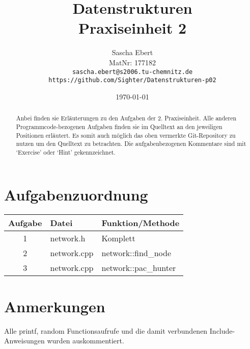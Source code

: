 \documentclass{article}
\title{Datenstrukturen\\Praxiseinheit 2}
\author
{
	Sascha Ebert\\
	MatNr: 177182\\
	\texttt{sascha.ebert@s2006.tu-chemnitz.de}\\
	\texttt{https://github.com/Sighter/Datenstrukturen-p02}\\
}
\date{\today}
\begin{document}
\maketitle

\begin{abstract}
Anbei finden sie Erläuterungen zu den Aufgaben der 2. Praxiseinheit.
Alle anderen Programmcode-bezogenen Aufgaben finden sie im Quelltext an den jeweiligen Positionen
erläutert. Es somit auch möglich das oben vermerkte Git-Repository zu nutzen um den Quelltext
zu betrachten. Die aufgabenbezogenen Kommentare sind mit `Exercise' oder `Hint' gekennzeichnet.
\end{abstract}

\section*{Aufgabenzuordnung}
\begin{tabular}{ c l l }
  Aufgabe & Datei & Funktion/Methode\\
  \hline
  1  & network.h & Komplett\\
  2  & network.cpp & network::find\_node\\
  3  & network.cpp & network::pac\_hunter\\
\end{tabular}

\section*{Anmerkungen}
Alle printf, random Functionsaufrufe und die damit verbundenen Include-Anweisungen wurden
auskommentiert.
\end{document}
